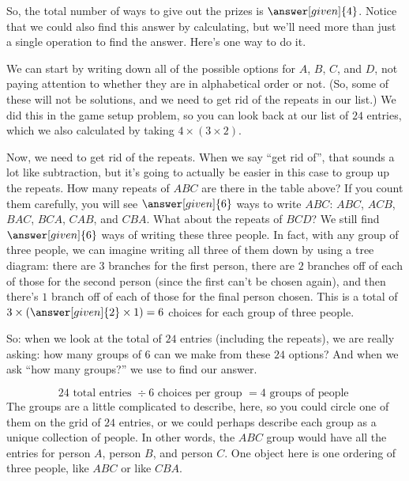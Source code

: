 \documentclass{ximera}
\begin{document}
\begin{question}
\begin{explanation}
So, the total number of ways to give out the prizes is $\answer[given]{4}$. Notice that we could also find this answer by calculating, but we'll need more than just a single operation to find the answer. Here's one way to do it. 

We can start by writing down all of the possible options for $A$, $B$, $C$, and $D$, not paying attention to whether they are in alphabetical order or not. (So, some of these will not be solutions, and we need to get rid of the repeats in our list.) We did this in the game setup problem, so you can look back at our list of $24$ entries, which we also calculated by taking $4 \times (3 \times 2)$. 

Now, we need to get rid of the repeats. When we say ``get rid of'', that sounds a lot like subtraction, but it's going to actually be easier in this case to group up the repeats. How many repeats of $ABC$ are there in the table above? If you count them carefully, you will see $\answer[given]{6}$ ways to write $ABC$: $ABC$, $ACB$, $BAC$, $BCA$, $CAB$, and $CBA$. What about the repeats of $BCD$? We still find $\answer[given]{6}$ ways of writing these three people. In fact, with any group of three people, we can imagine writing all three of them down by using a tree diagram: there are $3$ branches for the first person, there are $2$ branches off of each of those for the second person (since the first can't be chosen again), and then there's $1$ branch off of each of those for the final person chosen. This is a total of $3 \times \left ( \answer[given]{2} \times 1 \right ) = 6$ choices for each group of three people. 

So: when we look at the total of $24$ entries (including the repeats), we are really asking: how many groups of $6$ can we make from these $24$ options? And when we ask ``how many groups?'' we use  to find our answer.

\[
24 \textrm{ total entries } \div 6 \textrm{ choices per group } = 4 \textrm{ groups of people }
\]
The groups are a little complicated to describe, here, so you could circle one of them on the grid of $24$ entries, or we could perhaps describe each group as a unique collection of people. In other words, the $ABC$ group would have all the entries for person $A$, person $B$, and person $C$. One object here is one ordering of three people, like $ABC$ or like $CBA$.
\end{explanation}

\end{question}
\end{document}
